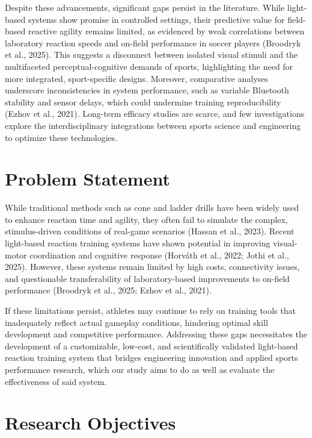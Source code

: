 Despite these advancements, significant gaps persist in the literature. While light-based systems show promise in controlled settings, their predictive value for field-based reactive agility remains limited, as evidenced by weak correlations between laboratory reaction speeds and on-field performance in soccer players (Broodryk et al., 2025). This suggests a disconnect between isolated visual stimuli and the multifaceted perceptual-cognitive demands of sports, highlighting the need for more integrated, sport-specific designs. Moreover, comparative analyses underscore inconsistencies in system performance, such as variable Bluetooth stability and sensor delays, which could undermine training reproducibility (Ezhov et al., 2021). Long-term efficacy studies are scarce, and few investigations explore the interdisciplinary integrations between sports science and engineering to optimize these technologies.


\section{Problem Statement}
While traditional methods such as cone and ladder drills have been widely used to enhance reaction time and agility, they often fail to simulate the complex, stimulus-driven conditions of real-game scenarios (Hassan et al., 2023). Recent light-based reaction training systems have shown potential in improving visual-motor coordination and cognitive response (Horváth et al., 2022; Jothi et al., 2025). However, these systems remain limited by high costs, connectivity issues, and questionable transferability of laboratory-based improvements to on-field performance (Broodryk et al., 2025; Ezhov et al., 2021).

If these limitations persist, athletes may continue to rely on training tools that inadequately reflect actual gameplay conditions, hindering optimal skill development and competitive performance. Addressing these gaps necessitates the development of a customizable, low-cost, and scientifically validated light-based reaction training system that bridges engineering innovation and applied sports performance research, which our study aims to do as well as evaluate the effectiveness of said system.


\section{Research Objectives}
\label{sec:researchobjectives}

